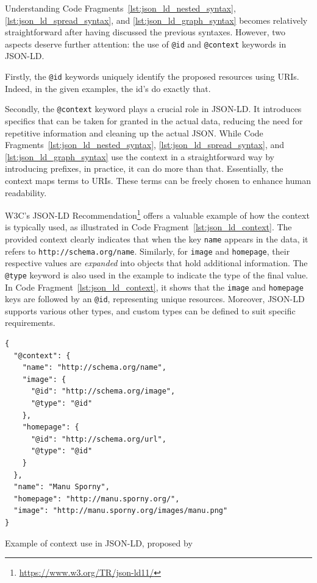 \begin{itemize}
    Understanding Code Fragments~\ref{lst:json_ld_nested_syntax}, \ref{lst:json_ld_spread_syntax}, and \ref{lst:json_ld_graph_syntax} becomes relatively straightforward after having discussed the previous syntaxes. However, two aspects deserve further attention: the use of \texttt{@id} and \texttt{@context} keywords in JSON-LD.

    Firstly, the \texttt{@id} keywords uniquely identify the proposed resources using URIs. Indeed, in the given examples, the id's do exactly that. \citep{kellogg2020jsonld}

    Secondly, the \texttt{@context} keyword plays a crucial role in JSON-LD. It introduces specifics that can be taken for granted in the actual data, reducing the need for repetitive information and cleaning up the actual JSON. While Code Fragments~\ref{lst:json_ld_nested_syntax}, \ref{lst:json_ld_spread_syntax}, and \ref{lst:json_ld_graph_syntax} use the context in a straightforward way by introducing prefixes, in practice, it can do more than that. Essentially, the context maps terms to URIs. These terms can be freely chosen to enhance human readability. \citep{kellogg2020jsonld}

    W3C's JSON-LD Recommendation\footnote{\url{https://www.w3.org/TR/json-ld11/}} offers a valuable example of how the context is typically used, as illustrated in Code Fragment~\ref{lst:json_ld_context}. The provided context clearly indicates that when the key \texttt{name} appears in the data, it refers to \texttt{http://schema.org/name}. Similarly, for \texttt{image} and \texttt{homepage}, their respective values are \textit{expanded} into objects that hold additional information. The \texttt{@type} keyword is also used in the example to indicate the type of the final value. In Code Fragment~\ref{lst:json_ld_context}, it shows that the \texttt{image} and \texttt{homepage} keys are followed by an \texttt{@id}, representing unique resources. Moreover, JSON-LD supports various other types, and custom types can be defined to suit specific requirements. \citep{kellogg2020jsonld}

    \begin{listing}[htbp]
        \begin{verbatim}
{
  "@context": {
    "name": "http://schema.org/name",
    "image": {
      "@id": "http://schema.org/image",
      "@type": "@id"
    },
    "homepage": {
      "@id": "http://schema.org/url",
      "@type": "@id"
    }
  },
  "name": "Manu Sporny",
  "homepage": "http://manu.sporny.org/",
  "image": "http://manu.sporny.org/images/manu.png"
}
        \end{verbatim}
        \caption{Example of context use in JSON-LD, proposed by \cite{kellogg2020jsonld}}
        \label{lst:json_ld_context}
    \end{listing}


\end{itemize}
